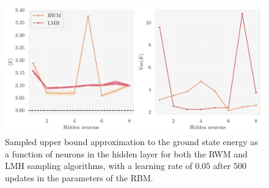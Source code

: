 \begin{figure}[!htb]
\begin{center}\includegraphics[width=\textwidth]{latex/figures/interacting_rwm_vs_lmh.pdf}
\end{center}
\caption{Sampled upper bound approximation to the ground state energy as a function of neurons in the hidden layer for both the RWM and LMH sampling algorithms, with a learning rate of $0.05$ after $500$ updates in the parameters of the RBM.}
\label{fig:interacting_rwm_vs_lmh}
\end{figure}










